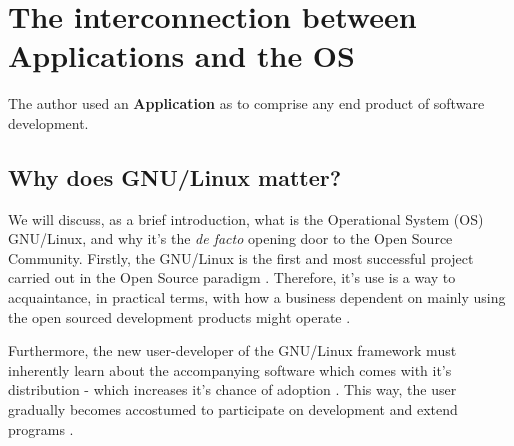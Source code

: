 \documentclass[
12pt,				%
openright,			%
oneside,			%
a4paper,			%
brazil,				%
english,			%
]{abntex2}
\begin{document}
\section{The interconnection between Applications and the OS}

The author used an \textbf{Application} as to comprise any end product of software development.

\subsection{Why does GNU/Linux matter?}

We will discuss, as a brief introduction, what is the Operational System
(OS) GNU/Linux, and why it's the \textit{de facto} opening door to the
Open Source Community. Firstly, the GNU/Linux is the first and most
successful project carried out in the Open Source paradigm
\cite{tu2000evolution,west2001open}. Therefore, it's use is a way to
acquaintance, in practical terms, with how a business dependent on mainly
using the open sourced development products might operate \cite{fink2003business}.   

Furthermore, the new user-developer of the GNU/Linux framework must
inherently learn about the accompanying software which comes with it's
distribution - which increases it's chance of adoption
\cite{west2001open}. This way, the user gradually becomes accostumed to
participate on development and extend programs \cite{hertel2003motivation}.
\end{document}
